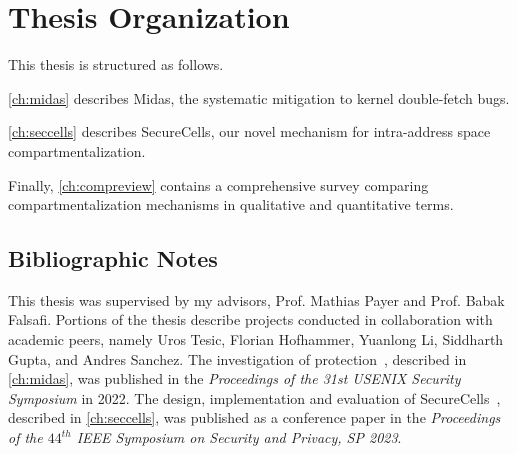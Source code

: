 
\section{Thesis Organization}
This thesis is structured as follows.

\autoref{ch:midas} describes Midas, the systematic mitigation to
kernel double-fetch bugs.

\autoref{ch:seccells} describes SecureCells, our novel mechanism for
intra-address space compartmentalization.

Finally, \autoref{ch:compreview} contains a comprehensive survey comparing
compartmentalization mechanisms in qualitative and quantitative terms.

\subsection{Bibliographic Notes}
This thesis was supervised by my advisors, Prof. Mathias Payer and Prof. Babak Falsafi.
Portions of the thesis describe projects conducted in collaboration with academic peers, 
namely Uros Tesic, Florian Hofhammer, Yuanlong Li, Siddharth Gupta, and Andres Sanchez.
The investigation of \tocttou protection~\cite{BhattacharyyaTP22}, described in \autoref{ch:midas},
was published in the
\emph{Proceedings of the 31st USENIX Security Symposium} in 2022.
The design, implementation and evaluation of SecureCells~\cite{BhattacharyyaHLGSFP23}, 
described in \autoref{ch:seccells}, was published as a conference paper in the 
\emph{Proceedings of the $44^{th}$ IEEE Symposium on Security and Privacy, SP 2023}.

